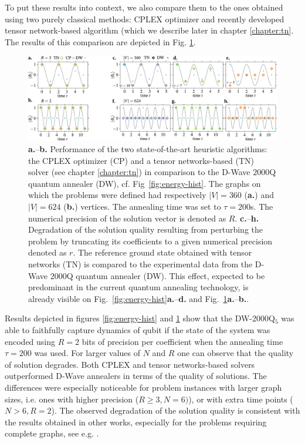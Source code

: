 To put these results into context, we also compare them to the ones obtained
using two purely classical methods: CPLEX optimizer and recently developed
tensor network-based algorithm (which we describe later in chapter
\ref{chapter:tn}. The results of this comparison are depicted in Fig.
\ref{fig:cplex_tn_dwave}.

\begin{figure}
  \centering
  \includegraphics[width=\textwidth]{figures/fig34_merge.pdf}
  \caption{ \textbf{a.}--\textbf{b.} Performance of the two state-of-the-art heuristic
    algorithms: the CPLEX optimizer (CP) and a tensor networks-based (TN) solver
    (see chapter \ref{chapter:tn}) in comparison to the D-Wave $2000$Q quantum annealer (DW),
    cf. Fig~\ref{fig:energy-hist}. The graphs on which the problems were defined
    had respectively $|V|=360$ (\textbf{a.}) and $|V|=624$ (\textbf{b.}) vertices. The annealing time was set
    to $\tau=200$\textmu{}s. The numerical precision of the solution vector is
    denoted as $R$. %
    \textbf{c.}--\textbf{h.} Degradation of the solution quality resulting from perturbing the
    problem by truncating its coefficients to a given
    numerical precision denoted as $r$. The reference ground state obtained
    with tensor networks (TN) is compared to the  experimental data from the
    D-Wave $2000$Q quantum annealer (DW). This effect, expected to be predominant
    in the current quantum annealing technology, is already visible on
    Fig.~\ref{fig:energy-hist}\textbf{a.}--\textbf{d.} and Fig.~\ref{fig:cplex_tn_dwave}\textbf{a.}--\textbf{b.}.
  }
  \label{fig:cplex_tn_dwave}
\end{figure}

Results depicted in figures \ref{fig:energy-hist} and \ref{fig:cplex_tn_dwave}
show that the DW-2000Q$_{5}$ was able to faithfully capture dynamics of qubit
if the state of the system was encoded using $R=2$ bits of precision per
coefficient when the annealing time $\tau=200$ was used. For larger values of
$N$ and $R$ one can observe that the quality of solution degrades. Both CPLEX
and tensor networks-based solvers outperformed D-Wave annealers in terms of the
quality of solutions. The differences were especially noticeable for problem
instances with larger graph sizes, i.e. ones with higher precision ($R \ge 3,
  N=6)$), or with extra time points ($N > 6, R = 2$). The observed degradation of
the solution quality is consistent with the results obtained in other works,
especially for the problems requiring complete graphs, see e.g.
\cite{Hamerly2019}.

